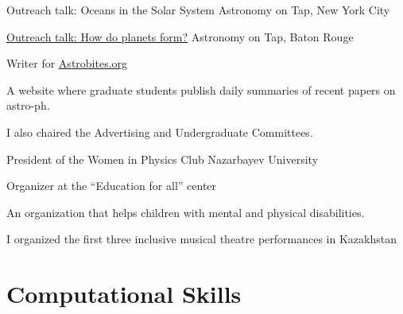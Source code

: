 \documentclass[10pt]{article} %
\begin{document}
\begin{paracol}{1}
	{Outreach talk: Oceans in the Solar System}
	{Astronomy on Tap, New York City}
	
	{\href{https://www.youtube.com/watch?v=E-OefNM564E}{Outreach talk: How do planets form?} \faVideoCamera}
	{Astronomy on Tap, Baton Rouge}

	{Writer for \href{https://astrobites.org/author/ssagynbayeva/}{Astrobites.org}}
	{A website where graduate students publish daily summaries of recent papers on astro-ph.
	
	I also chaired the Advertising and Undergraduate Committees.}

	
	
	{President of the Women in Physics Club}
	{Nazarbayev University}
	

	{Organizer at the “Education for all” center}
	{An organization that helps children with mental and physical disabilities. 
	
	I organized the first three inclusive musical theatre performances in Kazakhstan}
	
	








\section{Computational Skills} 



\end{paracol}
\end{document}

